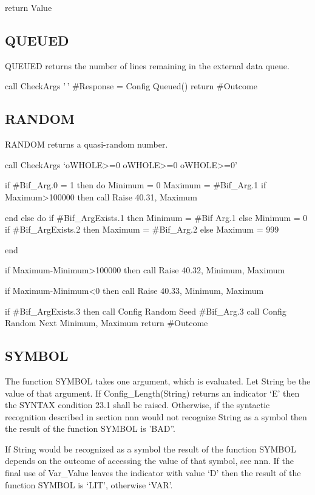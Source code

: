 return Value

\hypertarget{queued-1}{%
\subsection{QUEUED}\label{queued-1}}

QUEUED returns the number of lines remaining in the external data queue.

call CheckArgs '\,' \#Response = Config Queued() return \#Outcome

\hypertarget{random-1}{%
\subsection{RANDOM}\label{random-1}}

RANDOM returns a quasi-random number.

call CheckArgs `oWHOLE\textgreater=0 oWHOLE\textgreater=0
oWHOLE\textgreater=0'

if \#Bif\_Arg.0 = 1 then do Minimum = 0 Maximum = \#Bif\_Arg.1 if
Maximum\textgreater100000 then call Raise 40.31, Maximum

end else do if \#Bif\_ArgExists.1 then Minimum = \#Bif Arg.1 else
Minimum = 0 if \#Bif\_ArgExists.2 then Maximum = \#Bif\_Arg.2 else
Maximum = 999

end

if Maximum-Minimum\textgreater100000 then call Raise 40.32, Minimum,
Maximum

if Maximum-Minimum\textless0 then call Raise 40.33, Minimum, Maximum

if \#Bif\_ArgExists.3 then call Config Random Seed \#Bif\_Arg.3 call
Config Random Next Minimum, Maximum return \#Outcome

\hypertarget{symbol-1}{%
\subsection{SYMBOL}\label{symbol-1}}

The function SYMBOL takes one argument, which is evaluated. Let String
be the value of that argument. If Config\_Length(String) returns an
indicator `E' then the SYNTAX condition 23.1 shall be raised. Otherwise,
if the syntactic recognition described in section nnn would not
recognize String as a symbol then the result of the function SYMBOL is
'BAD''.

If String would be recognized as a symbol the result of the function
SYMBOL depends on the outcome of accessing the value of that symbol, see
nnn. If the final use of Var\_Value leaves the indicator with value `D'
then the result of the function SYMBOL is `LIT', otherwise `VAR'.

